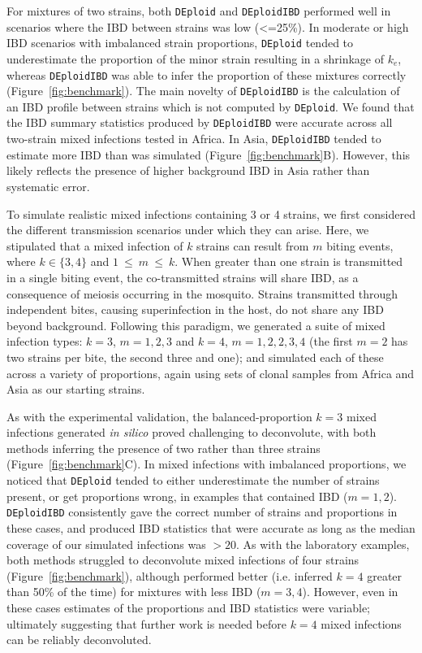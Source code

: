 \documentclass[9pt,lineno]{elife}
\begin{document}
For mixtures of two strains, both \texttt{DEploid} and \texttt{DEploidIBD} performed well in scenarios where the IBD between strains was low (<=25\%). In moderate or high IBD scenarios with imbalanced strain proportions, \texttt{DEploid} tended to underestimate the proportion of the minor strain resulting in a shrinkage of $k_e$, whereas \texttt{DEploidIBD} was able to infer the proportion of these mixtures correctly (Figure~\ref{fig:benchmark}).  The main novelty of \texttt{DEploidIBD} is the calculation of an IBD profile between strains which is not computed by \texttt{DEploid}. We found that the IBD summary statistics produced by \texttt{DEploidIBD} were accurate across all two-strain mixed infections tested in Africa. In Asia, \texttt{DEploidIBD} tended to estimate more IBD than was simulated (Figure~\ref{fig:benchmark}B). However, this likely reflects the presence of higher background IBD in Asia rather than systematic error.

To simulate realistic mixed infections containing 3 or 4 strains, we first considered the different transmission scenarios under which they can arise.  Here, we stipulated that a mixed infection of $k$ strains can result from $m$ biting events, where $k \in \{3,4\}$ and $1~{\leq}~{m}~{\leq}~k$. When greater than one strain is transmitted in a single biting event, the co-transmitted strains will share IBD, as a consequence of meiosis occurring in the mosquito. Strains transmitted through independent bites, causing superinfection in the host, do not share any IBD beyond background. Following this paradigm, we generated a suite of mixed infection types: $k=3$, $m=1, 2, 3$ and $k=4$, $m=1, 2, 2, 3, 4$ (the first $m=2$ has two strains per bite, the second three and one); and simulated each of these across a variety of proportions, again using sets of clonal samples from Africa and Asia as our starting strains.

As with the experimental validation, the balanced-proportion $k=3$ mixed infections generated {\it in silico} proved challenging to deconvolute, with both methods inferring the presence of two rather than three strains (Figure~\ref{fig:benchmark}C). In mixed infections with imbalanced proportions, we noticed that \texttt{DEploid} tended to either underestimate the number of strains present, or get proportions wrong, in examples that contained IBD ($m=1, 2$). \texttt{DEploidIBD} consistently gave the correct number of strains and proportions in these cases, and produced IBD statistics that were accurate as long as the median coverage of our simulated infections was $>20$. As with the laboratory examples, both methods struggled to deconvolute mixed infections of four strains (Figure~\ref{fig:benchmark}), although performed better (i.e. inferred $k=4$ greater than 50\% of the time) for mixtures with less IBD ($m=3, 4$). However, even in these cases estimates of the proportions and IBD statistics were variable; ultimately suggesting that further work is needed before $k=4$ mixed infections can be reliably deconvoluted.
\end{document}
